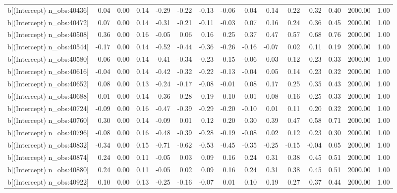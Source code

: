\begin{table}[ht]
\begin{tabular}{rrrrrrrrrrrrrrr}
  b[(Intercept) n\_obs:40436] & 0.04 & 0.00 & 0.14 & -0.29 & -0.22 & -0.13 & -0.06 & 0.04 & 0.14 & 0.22 & 0.32 & 0.40 & 2000.00 & 1.00 \\ 
  b[(Intercept) n\_obs:40472] & 0.07 & 0.00 & 0.14 & -0.31 & -0.21 & -0.11 & -0.03 & 0.07 & 0.16 & 0.24 & 0.36 & 0.45 & 2000.00 & 1.00 \\ 
  b[(Intercept) n\_obs:40508] & 0.36 & 0.00 & 0.16 & -0.05 & 0.06 & 0.16 & 0.25 & 0.37 & 0.47 & 0.57 & 0.68 & 0.76 & 2000.00 & 1.00 \\ 
  b[(Intercept) n\_obs:40544] & -0.17 & 0.00 & 0.14 & -0.52 & -0.44 & -0.36 & -0.26 & -0.16 & -0.07 & 0.02 & 0.11 & 0.19 & 2000.00 & 1.00 \\ 
  b[(Intercept) n\_obs:40580] & -0.06 & 0.00 & 0.14 & -0.41 & -0.34 & -0.23 & -0.15 & -0.06 & 0.03 & 0.12 & 0.23 & 0.33 & 2000.00 & 1.00 \\ 
  b[(Intercept) n\_obs:40616] & -0.04 & 0.00 & 0.14 & -0.42 & -0.32 & -0.22 & -0.13 & -0.04 & 0.05 & 0.14 & 0.23 & 0.32 & 2000.00 & 1.00 \\ 
  b[(Intercept) n\_obs:40652] & 0.08 & 0.00 & 0.13 & -0.24 & -0.17 & -0.08 & -0.01 & 0.08 & 0.17 & 0.25 & 0.35 & 0.43 & 2000.00 & 1.00 \\ 
  b[(Intercept) n\_obs:40688] & -0.01 & 0.00 & 0.14 & -0.36 & -0.28 & -0.19 & -0.10 & -0.01 & 0.08 & 0.16 & 0.25 & 0.33 & 2000.00 & 1.00 \\ 
  b[(Intercept) n\_obs:40724] & -0.09 & 0.00 & 0.16 & -0.47 & -0.39 & -0.29 & -0.20 & -0.10 & 0.01 & 0.11 & 0.20 & 0.32 & 2000.00 & 1.00 \\ 
  b[(Intercept) n\_obs:40760] & 0.30 & 0.00 & 0.14 & -0.09 & 0.01 & 0.12 & 0.20 & 0.30 & 0.39 & 0.47 & 0.58 & 0.71 & 2000.00 & 1.00 \\ 
  b[(Intercept) n\_obs:40796] & -0.08 & 0.00 & 0.16 & -0.48 & -0.39 & -0.28 & -0.19 & -0.08 & 0.02 & 0.12 & 0.23 & 0.30 & 2000.00 & 1.00 \\ 
  b[(Intercept) n\_obs:40832] & -0.34 & 0.00 & 0.15 & -0.71 & -0.62 & -0.53 & -0.45 & -0.35 & -0.25 & -0.15 & -0.04 & 0.05 & 2000.00 & 1.00 \\ 
  b[(Intercept) n\_obs:40874] & 0.24 & 0.00 & 0.11 & -0.05 & 0.03 & 0.09 & 0.16 & 0.24 & 0.31 & 0.38 & 0.45 & 0.51 & 2000.00 & 1.00 \\ 
  b[(Intercept) n\_obs:40880] & 0.24 & 0.00 & 0.11 & -0.05 & 0.02 & 0.09 & 0.16 & 0.24 & 0.31 & 0.38 & 0.45 & 0.51 & 2000.00 & 1.00 \\ 
  b[(Intercept) n\_obs:40922] & 0.10 & 0.00 & 0.13 & -0.25 & -0.16 & -0.07 & 0.01 & 0.10 & 0.19 & 0.27 & 0.37 & 0.44 & 2000.00 & 1.00 \\ 

\end{tabular}
\end{table}
